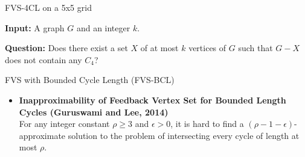 \documentclass{beamer}
\begin{document}
\begin{frame}{FVS-4CL on a 5x5 grid}
  \centering

  \footnotesize
  \begin{definition}

      \label{FVS}
      \textbf{Input:}
      A graph $G$ and an integer $k$.

      \textbf{Question:}
      Does there exist a set $X$ of at most $k$ vertices of $G$ such that $G - X$ does not contain 
      any $C_4$?
      
  \end{definition}

\end{frame}

\begin{frame}{FVS with Bounded Cycle Length (FVS-BCL)}
  \begin{itemize}
    \item \textbf{Inapproximability of Feedback Vertex Set for Bounded Length Cycles 
    (Guruswami and Lee, 2014)}\\
    \small For any integer constant $\rho \geq 3$ and $\epsilon > 0$, it is
    hard to find a $(\rho-1-\epsilon)$-approximate solution to the problem of intersecting every cycle
    of length at most $\rho$. 
  \end{itemize}
\end{frame}
\end{document}
